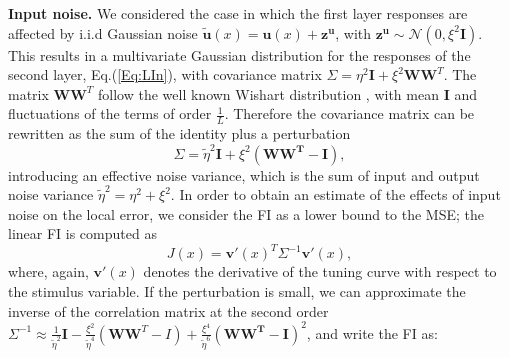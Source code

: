 \documentclass[a4paper]{article}
\begin{document}
\newline
\newline
\textbf{Input noise.}  We considered the case in which the first layer responses are affected by i.i.d Gaussian noise $  \mathbf{\tilde u}(x) = \mathbf{u}(x) + \mathbf{z^u} $, with $\mathbf{z^u} \sim \mathcal{N}(0,\xi^2\mathbf{I})$.  This results in a multivariate Gaussian distribution for the responses of the second layer, Eq.(\ref{Eq:LIn}), with covariance matrix 
$\Sigma = \eta^2 \mathbf{I} + \xi^2 \mathbf{W}\mathbf{W}^T.$ The matrix $\mathbf{W}\mathbf{W}^T$ follow the well known Wishart distribution \cite[]{Livan2017IntroductionPractice}, with mean $\mathbf{I}$ and fluctuations of the terms of order $\frac{1}{L}$. Therefore the covariance matrix can be rewritten as the sum of the identity plus a perturbation
\begin{equation}
\Sigma = \tilde\eta^2 \mathbf{I} + \xi^2(\mathbf{WW^T -I}),
\end{equation}
introducing an effective noise variance, which is the sum of input and output noise variance $\tilde\eta^2 = \eta^2 + \xi^2 $.  In order to obtain an estimate of the effects of input noise on the local error, we consider the FI as a lower bound to the MSE; the linear FI is computed as
\begin{equation}
J(x) = \mathbf{v'}(x)^T \Sigma^{-1}\mathbf{v'}(x),
\end{equation}
where, again,  $\mathbf{v'}(x)$ denotes the derivative of the tuning curve with respect to the stimulus variable.
If the perturbation is small, we can approximate the inverse of the correlation matrix at the second order 
\newline 
$ \Sigma^{-1} \approx \frac{1}{\tilde\eta^2} \mathbf{I} - \frac{\xi^2}{\tilde\eta^4} (\mathbf{W}\mathbf{W}^T-I) + \frac{\xi^4}{\tilde\eta^6}(\mathbf{WW^T}-\mathbf{I})^2  $,   and write the FI as:
\end{document}
